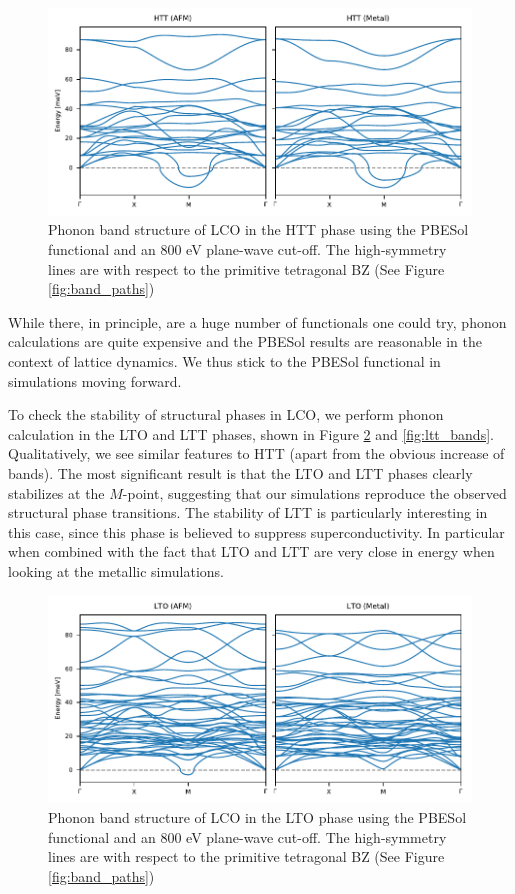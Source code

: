 \begin{figure}
	\centering
	\includegraphics[width=\textwidth]{fig/simulation/htt_bands.pdf}
	\caption[HTT Bands]{Phonon band structure of LCO in the HTT phase using the PBESol functional and an 800 eV plane-wave cut-off. The high-symmetry lines are with respect to the primitive tetragonal BZ (See Figure \ref{fig:band_paths})}
	\label{fig:htt_bands}
\end{figure}

While there, in principle, are a huge number of functionals one could try, phonon calculations are quite expensive and the PBESol results are reasonable in the context of lattice dynamics. We thus stick to the PBESol functional in simulations moving forward.

To check the stability of structural phases in LCO, we perform phonon calculation in the LTO and LTT phases, shown in Figure \ref{fig:lto_bands} and \ref{fig:ltt_bands}. Qualitatively, we see similar features to HTT (apart from the obvious increase of bands). The most significant result is that the LTO and LTT phases clearly stabilizes at the $M$-point, suggesting that our simulations reproduce the observed structural phase transitions. The stability of LTT is particularly interesting in this case, since this phase is believed to suppress superconductivity. In particular when combined with the fact that LTO and LTT are very close in energy when looking at the metallic simulations.

\begin{figure}
	\centering
	\includegraphics[width=\textwidth]{fig/simulation/lto_bands.pdf}
	\caption[LTO Bands]{Phonon band structure of LCO in the LTO phase using the PBESol functional and an 800 eV plane-wave cut-off. The high-symmetry lines are with respect to the primitive tetragonal BZ (See Figure \ref{fig:band_paths})}
	\label{fig:lto_bands}
\end{figure}

